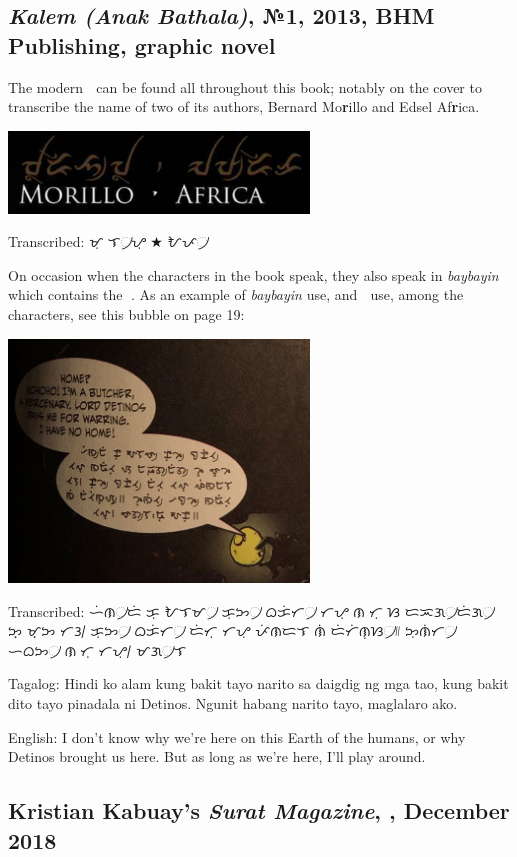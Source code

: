 \documentclass[a4paper,pagesize,openany,14pt,parskip=never]{scrbook}
\newcommand{\≈}{$\approx$}
\begin{document}
\subsection{{\em Kalem (Anak Bathala)}, №1, 2013, BHM Publishing, graphic novel}
\label{Kalem}

The modern {\baybayin ᜍ} can be found all throughout this book; notably on the cover to transcribe the name of two of its authors, Bernard Mo{\bfseries r}illo and Edsel Af{\bfseries r}ica.

\includegraphics[width=0.6\textwidth]{MorilloAfrica}

Transcribed: {\baybayin ᜋᜓᜍᜒᜎ᜴ᜌᜓ} $\bigstar$ {\baybayin ᜀᜉ᜴ᜍᜒᜃ}

On occasion when the characters in the book speak, they also speak in {\em baybayin} which contains the {\baybayin ᜍ}. As an example of {\em baybayin} use, and {\baybayin ᜍ} use, among the characters, see this bubble on page 19:

\includegraphics[width=0.6\textwidth]{KalemSpeechBubble}

Transcribed: {\baybayin ᜑᜒᜈ᜴ᜇᜒ ᜃᜓ ᜀᜎᜋ᜴ ᜃᜓᜅ᜴ ᜊᜃᜒᜆ᜴ ᜆᜌᜓ ᜈᜍᜒᜆᜓ ᜐ ᜇᜁᜄ᜴ᜇᜒᜄ᜴ ᜅ᜔ ᜋ᜔ᜅ ᜆᜂ᜵ ᜃᜓᜅ᜴ ᜊᜃᜒᜆ᜴ ᜇᜒᜆᜓ ᜆᜌᜓ ᜉᜒᜈᜇᜎ ᜈᜒ ᜇᜒᜆᜒᜈᜓᜐ᜴᜶ ᜅᜓᜈᜒᜆ᜴ ᜑᜊᜅ᜴ ᜈᜍᜒᜆᜓ ᜆᜌᜓ᜵ ᜋᜄ᜴ᜎᜍᜓ ᜀᜃᜓ᜶}

Tagalog: Hindi ko alam kung bakit tayo narito sa daigdig ng mga tao, kung bakit dito tayo pinadala ni Detinos. Ngunit habang narito tayo, maglalaro ako.

English: I don't know why we're here on this Earth of the humans, or why Detinos brought us here. But as long as we're here, I'll play around.

\subsection{Kristian Kabuay's {\em Surat Magazine}, , December 2018}
\label{Surat}
\end{document}
